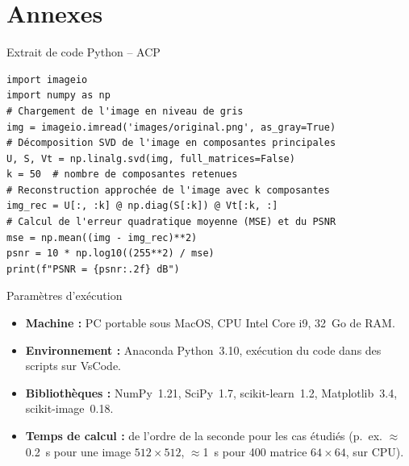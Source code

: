 \documentclass{beamer}
\begin{document}
\section{Annexes}

\begin{frame}[t,fragile]{Extrait de code Python – ACP}
\begin{lstlisting}[inputencoding=utf8]
import imageio
import numpy as np
# Chargement de l'image en niveau de gris
img = imageio.imread('images/original.png', as_gray=True)
# Décomposition SVD de l'image en composantes principales
U, S, Vt = np.linalg.svd(img, full_matrices=False)
k = 50  # nombre de composantes retenues
# Reconstruction approchée de l'image avec k composantes
img_rec = U[:, :k] @ np.diag(S[:k]) @ Vt[:k, :]
# Calcul de l'erreur quadratique moyenne (MSE) et du PSNR
mse = np.mean((img - img_rec)**2)
psnr = 10 * np.log10((255**2) / mse)
print(f"PSNR = {psnr:.2f} dB")
\end{lstlisting}
\end{frame}



\begin{frame}{Paramètres d'exécution}
\begin{itemize}
  \item \textbf{Machine :} PC portable sous MacOS, CPU Intel Core i9, 32~Go de RAM.
  \item \textbf{Environnement :} Anaconda Python 3.10, exécution du code dans des scripts sur VsCode.
  \item \textbf{Bibliothèques :} NumPy 1.21, SciPy 1.7, scikit-learn 1.2, Matplotlib 3.4, scikit-image 0.18.
  \item \textbf{Temps de calcul :} de l’ordre de la seconde pour les cas étudiés (p.~ex. $\approx$0.2~s pour une image $512\times512$, $\approx$1~s pour 400 matrice $64\times64$, sur CPU).
\end{itemize}
\end{frame}
\end{document}
